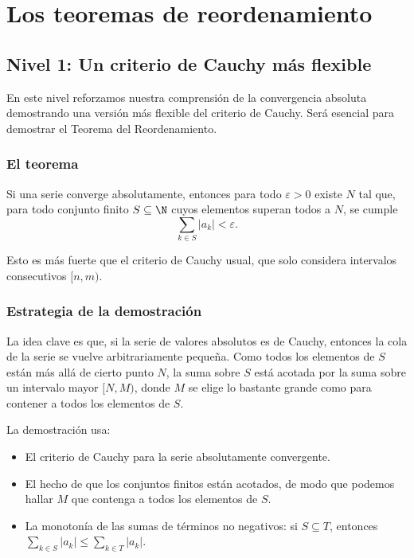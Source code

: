 \chapter{Los teoremas de reordenamiento}

\section{Nivel 1: Un criterio de Cauchy más flexible}

En este nivel reforzamos nuestra comprensión de la convergencia absoluta demostrando una versión más flexible del criterio de Cauchy. Será esencial para demostrar el Teorema del Reordenamiento.

\subsection{El teorema}

\begin{teorema}
Si una serie converge absolutamente, entonces para todo $\varepsilon > 0$ existe $N$ tal que, para todo conjunto finito $S \subseteq \N$ cuyos elementos superan todos a $N$, se cumple
\[
  \sum_{k \in S} |a_k| < \varepsilon .
\]
\end{teorema}

Esto es más fuerte que el criterio de Cauchy usual, que solo considera intervalos consecutivos $[n, m)$.

\subsection{Estrategia de la demostración}

La idea clave es que, si la serie de valores absolutos es de Cauchy, entonces la cola de la serie se vuelve arbitrariamente pequeña. Como todos los elementos de $S$ están más allá de cierto punto $N$, la suma sobre $S$ está acotada por la suma sobre un intervalo mayor $[N, M)$, donde $M$ se elige lo bastante grande como para contener a todos los elementos de $S$.

La demostración usa:
\begin{itemize}
  \item El criterio de Cauchy para la serie absolutamente convergente.
  \item El hecho de que los conjuntos finitos están acotados, de modo que podemos hallar $M$ que contenga a todos los elementos de $S$.
  \item La monotonía de las sumas de términos no negativos: si $S \subseteq T$, entonces $\sum_{k \in S} |a_k| \le \sum_{k \in T} |a_k|$.
\end{itemize}

